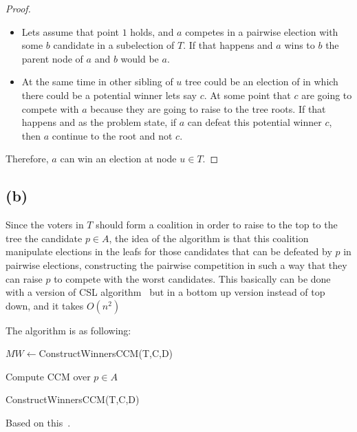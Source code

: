 \documentclass[12pt, a4paper]{article}
\begin{document}
\begin{proof}
  \begin{itemize}
    \item Lets assume that point $1$ holds, and $a$ competes in a pairwise election with some $b$ candidate in a subelection of $T$. 
    If that happens and $a$ wins to $b$ the parent node of $a$ and $b$ would be $a$.
    \item At the same time in other sibling of $u$ tree could be an election of in which there could be a potential winner lets say $c$. 
    At some point that $c$ are going to compete with $a$ because they are going to raise to the tree roots. If that happens and as the problem 
    state, if $a$ can defeat this potential winner $c$, then $a$ continue to the root and not $c$.
  \end{itemize}

  Therefore, $a$ can win an election at node $u \in T$.
\end{proof}

\subsection{(b)}
Since the voters in $T$ should form a coalition in order to raise to the top to the tree the candidate $p \in A$, the idea of the algorithm
is that this coalition manipulate elections in the leafs for those candidates that can be defeated by $p$ in pairwise elections, constructing the pairwise competition
in such a way that they can raise $p$ to compete with the worst candidates. This basically can be done with a version of CSL algorithm~\cite{csl} but in a bottom up version instead of top down, and it takes $O(n^2)$

The algorithm is as following:

\begin{algorithm}[H]
  $MW \leftarrow $ConstructWinnersCCM(T,C,D)
  \caption{Compute CCM over $p \in A$}
\end{algorithm}

\begin{algorithm}[H]
  \caption{ConstructWinnersCCM(T,C,D)}
\end{algorithm}

Based on this~\cite{ccmalgo}.



\end{document}
